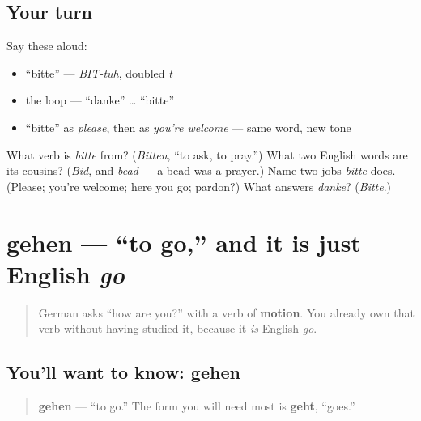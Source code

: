 \subsection*{Your turn}
Say these aloud:

\begin{itemize}
\raggedright
  \item \textquotedblleft{}bitte\textquotedblright{} — \emph{BIT-tuh}, doubled \emph{t}
  \item the loop — \textquotedblleft{}danke\textquotedblright{} … \textquotedblleft{}bitte\textquotedblright{}
  \item \textquotedblleft{}bitte\textquotedblright{} as \emph{please}, then as \emph{you're welcome} — same word, new tone
\end{itemize}

\begin{tcolorbox}[breakable,colback=teal!4,colframe=teal!35!black,title={Before you move on}]
What verb is \emph{bitte} from? (\emph{Bitten}, \textquotedblleft{}to ask, to pray.\textquotedblright{}) What two English words are its cousins? (\emph{Bid}, and \emph{bead} — a bead was a prayer.) Name two jobs \emph{bitte} does. (Please; you're welcome; here you go; pardon?) What answers \emph{danke}? (\emph{Bitte}.)
\end{tcolorbox}
\section[gehen]{gehen — \textquotedblleft{}to go,\textquotedblright{} and it is just English \emph{go}}

\label{lesson:GE-C03-gehen}



\begin{quote}
German asks \textquotedblleft{}how are you?\textquotedblright{} with a verb of \textbf{motion}. You already own that verb without having studied it, because it \emph{is} English \emph{go}.
\end{quote}

\subsection*{You'll want to know: gehen}
\begin{quote}
\textbf{gehen} — \textquotedblleft{}to go.\textquotedblright{} The form you will need most is \textbf{geht}, \textquotedblleft{}goes.\textquotedblright{}
\end{quote}

